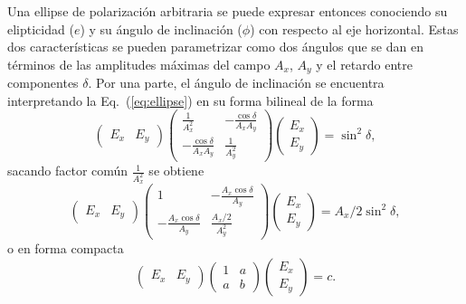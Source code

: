 Una ellipse de polarización arbitraria se puede expresar entonces
conociendo su elipticidad ($e$) y su ángulo de inclinación ($\phi$)
con respecto al eje horizontal. Estas dos características se pueden
parametrizar como dos ángulos que se dan en
términos de las amplitudes máximas del campo $A_x$, $A_y$
y el retardo entre componentes $\delta$. Por una parte, el ángulo de
inclinación se encuentra interpretando la Eq.~(\ref{eq:ellipse}) en
su forma bilineal de la forma
\begin{equation}
\begin{pmatrix}
E_x & E_y
\end{pmatrix}
\begin{pmatrix}
\frac{1}{A_x^2} & -\frac{\cos{\delta}}{A_xA_y}\\
 -\frac{\cos{\delta}}{A_xA_y} & \frac{1}{A_y^2} 
\end{pmatrix}
\begin{pmatrix}
E_x \\ E_y
\end{pmatrix}
=\sin^2{\delta},
\end{equation}
sacando factor común $\frac{1}{A_x^2} $ se obtiene
\begin{equation}
\begin{pmatrix}
E_x & E_y
\end{pmatrix}
\begin{pmatrix}
1 & -\frac{A_x\cos{\delta}}{A_y}\\
 -\frac{A_x\cos{\delta}}{A_y} & \frac{A_x/2}{A_y^2} 
\end{pmatrix}
\begin{pmatrix}
E_x \\ E_y
\end{pmatrix}
=A_x/2\sin^2{\delta},
\end{equation}
o en forma compacta
\begin{equation}
\begin{pmatrix}
E_x & E_y
\end{pmatrix}
\begin{pmatrix}
1 & a\\
 a & b 
\end{pmatrix}
\begin{pmatrix}
E_x \\ E_y
\end{pmatrix}
=c.
\end{equation}

